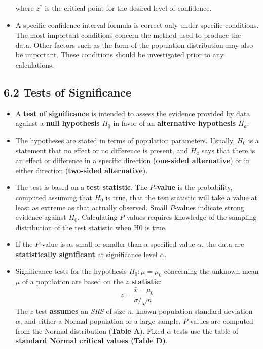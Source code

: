 \begin{itemize}
			where $z^{*}$ is the critical point for the desired level of confidence.
			
			\item A specific confidence interval formula is correct only under specific conditions. The most important conditions concern the method used to produce the data. Other factors such as the form of the population distribution may also be important. These conditions should be investigated prior to any calculations.
		\end{itemize}
	\subsection{6.2 Tests of Significance}
		\begin{itemize}
			\item A \textbf{test of significance} is intended to assess the evidence provided by data against a \textbf{null hypothesis} $H_0$ in favor of an \textbf{alternative hypothesis} $H_a$.
			
			\item The hypotheses are stated in terms of population parameters. Usually, $H_0$ is a statement that no effect or no difference is present, and $H_a$ says that there is an effect or difference in a specific direction (\textbf{one-sided alternative}) or in either direction (\textbf{two-sided alternative}).
			
			\item The test is based on a \textbf{test statistic}. The \textbf{$P$-value} is the probability, computed assuming that $H_0$ is true, that the test statistic will take a value at least as extreme as that actually observed. Small $P$-values indicate strong evidence against $H_0$. Calculating $P$-values requires knowledge of the sampling distribution of the test statistic when H0 is true.
			
			\item If the $P$-value is as small or smaller than a specified value $\alpha$, the data are \textbf{statistically significant} at significance level $\alpha$.
			
			\item Significance tests for the hypothesis $H_0: \mu = \mu_0$ concerning the unknown mean $\mu$ of a population are based on the \textbf{$z$ statistic}: \[z=\frac{\bar{x}-\mu_0}{\sigma/\sqrt{n}}\]			
			The $z$ test \textbf{assumes} an \textit{SRS} of size $n$, known population standard deviation $\alpha$, and either a Normal population or a large sample. $P$-values are computed from the Normal distribution (\textbf{Table A}). Fixed $\alpha$ tests use the table of \textbf{standard Normal critical values (\textbf{Table D})}.
		\end{itemize}
